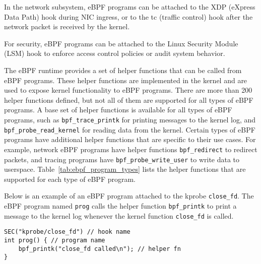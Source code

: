 In the network subsystem, eBPF programs can be attached to the XDP (eXpress Data Path) hook during NIC ingress,
or to the tc (traffic control) hook after the network packet is received by the kernel.

For security, eBPF programs can be attached to the Linux Security Module (LSM) hook to enforce access control policies or audit system behavior.

The eBPF runtime provides a set of helper functions that can be called from eBPF programs.
These helper functions are implemented in the kernel and are used to expose kernel functionality to eBPF programs.
There are more than 200 helper functions defined, but not all of them are supported for all types of eBPF programs.
A base set of helper functions is available for all types of eBPF programs,
such as \texttt{bpf\_trace\_printk} for printing messages to the kernel log,
and \texttt{bpf\_probe\_read\_kernel} for reading data from the kernel.
Certain types of eBPF programs have additional helper functions that are specific to their use cases.
For example, network eBPF programs have helper functions \texttt{bpf\_redirect} to redirect packets, and
tracing programs have \texttt{bpf\_probe\_write\_user} to write data to userspace.
Table~\ref{tab:ebpf_program_types} lists the helper functions that are supported for each type of eBPF program.

Below is an example of an eBPF program attached to the kprobe \texttt{close\_fd}.
The eBPF program named \texttt{prog} calls the helper function \texttt{bpf\_printk}
to print a message to the kernel log whenever the kernel function \texttt{close\_fd} is called.

\begin{verbatim}
SEC("kprobe/close_fd") // hook name
int prog() { // program name
    bpf_printk("close_fd called\n"); // helper fn
}
\end{verbatim}

